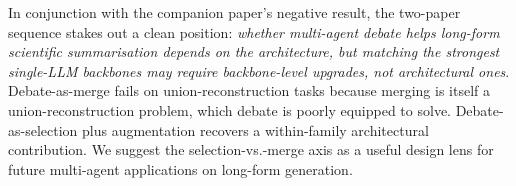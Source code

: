 \documentclass[11pt,a4paper]{article}
\begin{document}
In conjunction with the companion paper's negative result, the
two-paper sequence stakes out a clean position: \emph{whether
multi-agent debate helps long-form scientific summarisation depends
on the architecture, but matching the strongest single-LLM
backbones may require backbone-level upgrades, not architectural
ones}. Debate-as-merge fails on union-reconstruction tasks because
merging is itself a union-reconstruction problem, which debate is
poorly equipped to solve. Debate-as-selection plus augmentation
recovers a within-family architectural contribution. We suggest the
selection-vs.-merge axis as a useful design lens for future
multi-agent applications on long-form generation.



\end{document}
